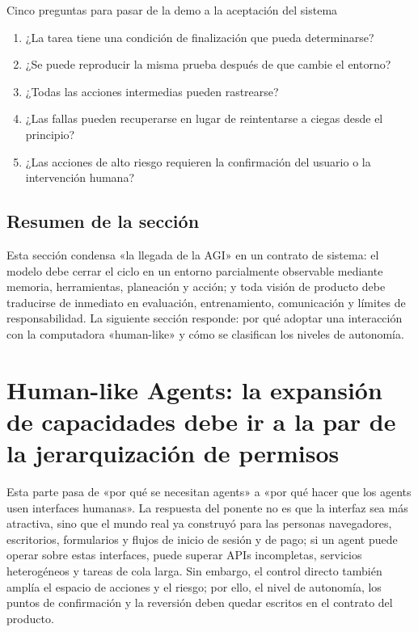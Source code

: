 \documentclass[a4paper]{article}
\begin{document}
\begin{importantbox}{Cinco preguntas para pasar de la demo a la aceptación del sistema}
\begin{enumerate}
  \item ¿La tarea tiene una condición de finalización que pueda determinarse?
  \item ¿Se puede reproducir la misma prueba después de que cambie el entorno?
  \item ¿Todas las acciones intermedias pueden rastrearse?
  \item ¿Las fallas pueden recuperarse en lugar de reintentarse a ciegas desde el principio?
  \item ¿Las acciones de alto riesgo requieren la confirmación del usuario o la intervención humana?
\end{enumerate}
\end{importantbox}

\subsection{Resumen de la sección}

Esta sección condensa «la llegada de la AGI» en un contrato de sistema: el modelo debe cerrar el ciclo en un entorno parcialmente observable mediante memoria, herramientas, planeación y acción; y toda visión de producto debe traducirse de inmediato en evaluación, entrenamiento, comunicación y límites de responsabilidad. La siguiente sección responde: por qué adoptar una interacción con la computadora «human-like» y cómo se clasifican los niveles de autonomía.
\section{Human-like Agents: la expansión de capacidades debe ir a la par de la jerarquización de permisos}

Esta parte pasa de «por qué se necesitan agents» a «por qué hacer que los agents usen interfaces humanas». La respuesta del ponente no es que la interfaz sea más atractiva, sino que el mundo real ya construyó para las personas navegadores, escritorios, formularios y flujos de inicio de sesión y de pago; si un agent puede operar sobre estas interfaces, puede superar APIs incompletas, servicios heterogéneos y tareas de cola larga. Sin embargo, el control directo también amplía el espacio de acciones y el riesgo; por ello, el nivel de autonomía, los puntos de confirmación y la reversión deben quedar escritos en el contrato del producto.
\end{document}
